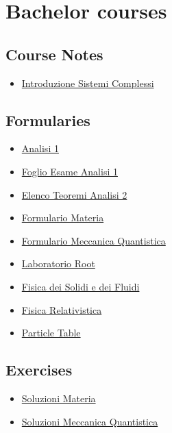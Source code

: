 \documentclass{article}
\begin{document}
\section{Bachelor courses}

\subsection{Course Notes}

    \begin{itemize}
        \item \href{source/introduzione_sistemi_complessi.html}{Introduzione Sistemi Complessi}
    \end{itemize}

\subsection{Formularies}

    \begin{itemize}
        \item \href{source/analisi_1.html}{Analisi 1}
        \item \href{source/foglio_esame_analisi1.html}{Foglio Esame Analisi 1}
        \item \href{source/elenco_teoremi_analisi_2.html}{Elenco Teoremi Analisi 2}
        \item \href{source/formulario_materia.html}{Formulario Materia}
        \item \href{source/formulario_meccanica_quantistica.html}{Formulario Meccanica Quantistica}
        \item \href{source/laboratorio_root.html}{Laboratorio Root}
        \item \href{source/fisica_dei_solidi_e_dei_fluidi.html}{Fisica dei Solidi e dei Fluidi}
        \item \href{source/fisica_relativistica.html}{Fisica Relativistica}
        \item \href{source/particle_table.html}{Particle Table}
    \end{itemize}

\subsection{Exercises}

    \begin{itemize}
        \item \href{source/soluzioni_materia.html}{Soluzioni Materia}
        \item \href{source/soluzioni_meccanica_quantistica.html}{Soluzioni Meccanica Quantistica}
    \end{itemize}
\end{document}
